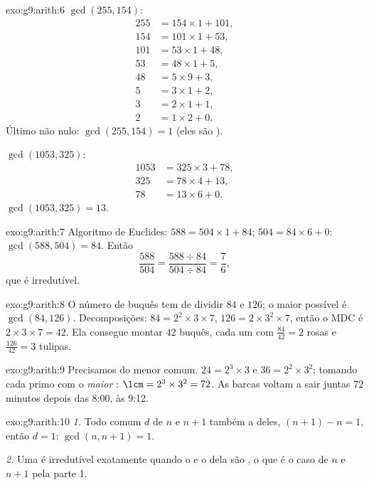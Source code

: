 \begin{solution}{exo:g9:arith:6}
$\gcd(255, 154)$:
\begin{align*}
255 &= 154 \times 1 + 101, \\
154 &= 101 \times 1 + 53, \\
101 &= 53 \times 1 + 48, \\
53 &= 48 \times 1 + 5, \\
48 &= 5 \times 9 + 3, \\
5 &= 3 \times 1 + 2, \\
3 &= 2 \times 1 + 1, \\
2 &= 1 \times 2 + 0 .
\end{align*}
Último  não nulo: $\gcd(255, 154) = 1$ (eles são ).

$\gcd(1053, 325)$:
\begin{align*}
1053 &= 325 \times 3 + 78, \\
325 &= 78 \times 4 + 13, \\
78 &= 13 \times 6 + 0 .
\end{align*}
$\gcd(1053, 325) = 13$.
\end{solution}

\begin{solution}{exo:g9:arith:7}
Algoritmo de Euclides: $588 = 504 \times 1 + 84$;
$504 = 84 \times 6 + 0$: $\gcd(588, 504) = 84$. Então
\[
\frac{588}{504} = \frac{588 \div 84}{504 \div 84} = \frac{7}{6},
\]
que é irredutível.
\end{solution}

\begin{solution}{exo:g9:arith:8}
O número de buquês tem de dividir $84$ e $126$; o maior possível é
$\gcd(84, 126)$. Decomposições: $84 = 2^2 \times 3 \times 7$,
$126 = 2 \times 3^2 \times 7$, então o MDC é
$2 \times 3 \times 7 = 42$. Ela consegue montar $42$ buquês, cada um
com $\frac{84}{42} = 2$ rosas e $\frac{126}{42} = 3$ tulipas.
\end{solution}

\begin{solution}{exo:g9:arith:9}
Precisamos do menor  comum. $24 = 2^3 \times 3$ e
$36 = 2^2 \times 3^2$; tomando cada primo com o \emph{maior} :
$\lcm = 2^3 \times 3^2 = 72$. As barcas voltam a sair juntas $72$
minutos depois das 8:00, às 9:12.
\end{solution}

\begin{solution}{exo:g9:arith:10}
\emph{1.} Todo  comum $d$ de $n$ e $n+1$  também a
 deles, $(n+1) - n = 1$, então $d = 1$: $\gcd(n, n+1) = 1$.

\emph{2.} Uma  é irredutível exatamente quando o  e o
 dela são , o que é o caso de $n$ e $n + 1$
pela parte 1.
\end{solution}

